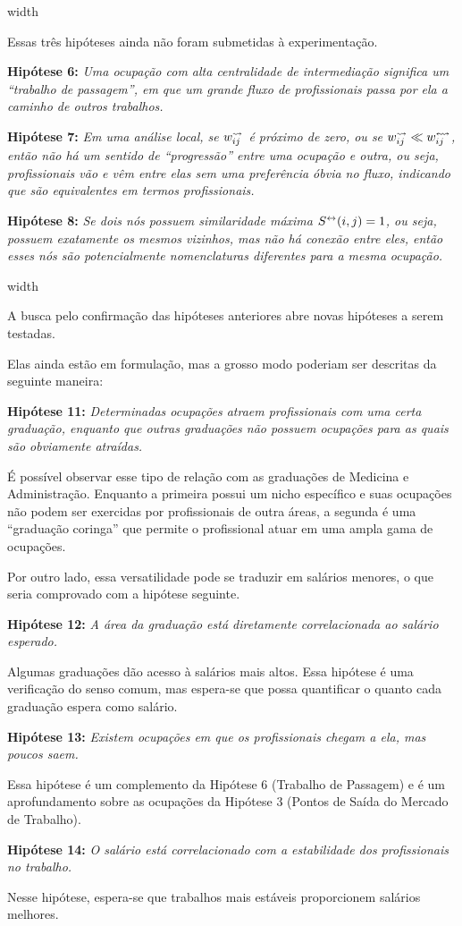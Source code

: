 \documentclass[10pt,a4paper,final]{article}
\newcommand\disappearingrule{%
  \par %
  \vskip10pt %
  \leaders\vrule width \textwidth\vskip0.4pt %
  \nointerlineskip %
  \vskip10pt %
}
\newenvironment{slideshort}[1]
{
  \disappearingrule
  
  \begin{minipage}[t][18\baselineskip]{\linewidth}
    \setlength{\parskip}{1ex}
    \begin{wrapfigure}{l}{0.5\textwidth}
      \includeslide[width=0.48\textwidth]{#1}
      \label{sde:#1}
    \end{wrapfigure}}
{\end{minipage}}
\newenvironment{slidelong}[1]
{
  \disappearingrule
  
  \begin{minipage}[t]{\linewidth}
    \setlength{\parskip}{1ex}
    \begin{wrapfigure}{l}{0.5\textwidth}
      \includeslide[width=0.48\textwidth]{#1}%
      \vspace{-0.8cm}
      \label{sde:#1}
    \end{wrapfigure}}
    {\end{minipage}}
\begin{document}
\begin{slideshort}{hipoteses-pendentes}
  Essas três hipóteses ainda não foram submetidas à experimentação.
  
  \textbf{Hipótese 6:} \textit{Uma ocupação com alta centralidade de intermediação significa um \enquote{trabalho de passagem}, em que um grande fluxo de profissionais passa por ela a caminho de outros trabalhos.}
  
  \textbf{Hipótese 7:} \textit{Em uma análise local, se $w^\leadsto_{ij}$ é próximo de zero, ou se $w^\leadsto_{ij} \ll w^\leftrightsquigarrow_{ij}$, então não há um sentido de \enquote{progressão} entre uma ocupação e outra, ou seja, profissionais vão e vêm entre elas sem uma preferência óbvia no fluxo, indicando que são equivalentes em termos profissionais.}
  
  \textbf{Hipótese 8:} \textit{Se dois nós possuem similaridade máxima $S^\leftrightarrow(i,j) = 1$, ou seja, possuem exatamente os mesmos vizinhos, mas não há conexão entre eles, então esses nós são potencialmente nomenclaturas diferentes para a mesma ocupação.}
\end{slideshort}

\begin{slidelong}{hipoteses-novas}
  A busca pelo confirmação das hipóteses anteriores abre novas hipóteses a serem testadas.
  
  Elas ainda estão em formulação, mas a grosso modo poderiam ser descritas da seguinte maneira:
  
  \textbf{Hipótese 11:} \textit{Determinadas ocupações atraem profissionais com uma certa graduação, enquanto que outras graduações não possuem ocupações para as quais são obviamente atraídas.}
  
  É possível observar esse tipo de relação com as graduações de Medicina e Administração. Enquanto a primeira possui um nicho específico e suas ocupações não podem ser exercidas por profissionais de outra áreas, a segunda é uma \enquote{graduação coringa} que permite o profissional atuar em uma ampla gama de ocupações.
  
  Por outro lado, essa versatilidade pode se traduzir em salários menores, o que seria comprovado com a hipótese seguinte.
  
  \textbf{Hipótese 12:} \textit{A área da graduação está diretamente correlacionada ao salário esperado.}
  
  Algumas graduações dão acesso à salários mais altos. Essa hipótese é uma verificação do senso comum, mas espera-se que possa quantificar o quanto cada graduação espera como salário.
  
  \textbf{Hipótese 13:} \textit{Existem ocupações em que os profissionais chegam a ela, mas poucos saem.}
  
  Essa hipótese é um complemento da Hipótese 6 (Trabalho de Passagem) e é um aprofundamento sobre as ocupações da Hipótese 3 (Pontos de Saída do Mercado de Trabalho).
  
  \textbf{Hipótese 14:} \textit{O salário está correlacionado com a estabilidade dos profissionais no trabalho.}
  
  Nesse hipótese, espera-se que trabalhos mais estáveis proporcionem salários melhores.
\end{slidelong}
\end{document}
